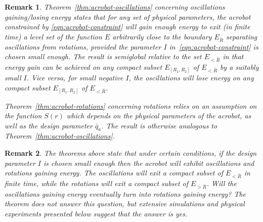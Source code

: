 \documentclass[journal,twoside,web, twocolumn]{ieeecolor}
\newtheorem{rem}{Remark}
\newcommand*{\cP}{\mathcal{P}}
\begin{document}
\begin{rem}
Theorem~\ref{thm:acrobot-oscillations} concerning oscillations
gai\-ning/lo\-sing energy states that for any set of physical parameters, the
acrobot constrained by
\eqref{eqn:acrobot-constraint} will gain enough energy to exit (in finite time) a
level set of the function $E$ arbitrarily close to the boundary $E_{\bar R}$
separating oscillations from rotations, provided the parameter $I$
in~\eqref{eqn:acrobot-constraint} is chosen small enough. The result is
semiglobal relative to the set $E_{<\bar R}$ in that energy gain can be achieved
on any compact subset $E_{[R_1,R_2]}$ of $E_{<\bar R}$ by a suitably small $I$.
Vice versa, for small {\em negative} $I$, the oscillations will lose energy on any compact subset $E_{[R_1,R_2]}$ of $E_{<\bar R}$.

Theorem~\ref{thm:acrobot-rotations} concerning rotations relies on an assumption on the function $S(r)$ which depends on the physical parameters of the acrobot, as well as the design parameter $\bar q_a$. The result is otherwise analogous to Theorem~\ref{thm:acrobot-oscillations}.
\end{rem}

\begin{rem}\label{rem:thm:caveat}
The theorems above state that under certain conditions, if the design parameter $I$ is chosen small enough then the acrobot will exhibit oscillations and rotations gaining energy. The oscillations will exit a compact subset of $E_{<\bar R}$ in finite time, while the rotations will exit a compact subset of $E_{>\bar R}$. Will the oscillations gaining energy eventually turn into rotations gaining energy? The theorem does not answer this question, but extensive simulations and physical experiments presented below suggest that the answer is yes. 
\end{rem}
%
%
%
%

\end{document}
